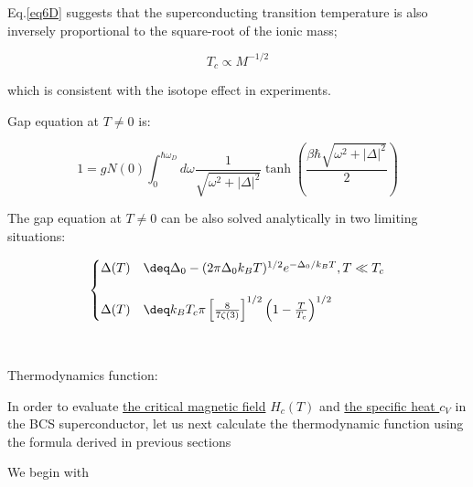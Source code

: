 Eq.\eqref{eq6D} suggests that the superconducting transition temperature is also inversely proportional to the square-root of the ionic mass; 

\[T_c\propto M^{-1/2} \]

which is consistent with the isotope effect in experiments. 

Gap equation at $T\neq 0$ is:

\[1=gN(0)\int_0^{\hbar\omega_D}d\omega\frac{1}{\sqrt{\omega^2+|\Delta|^2}}\tanh\left(\frac{\beta\hbar\sqrt{\omega^2+|\Delta|^2}}{2}\right) \]

The gap equation at $T\neq0$ can be also solved analytically in two limiting situations:

\[\begin{cases}
\Delta(T)&\deq \Delta_0 - (2\pi\Delta_0k_BT)^{1/2}e^{-\Delta_0/k_BT}, T\ll T_c\\
&\\
\Delta(T)&\deq k_BT_c\pi\left[\frac{8}{7\zeta(3)}\right]^{1/2}\left(1-\frac{T}{T_c}\right)^{1/2}
\end{cases}\]

\dotfill

\ 

Thermodynamics function:

In order to evaluate \uline{the critical magnetic field} $H_c(T)$ and \uline{the specific heat $c_V$} in the BCS superconductor, let us next calculate the thermodynamic function using the formula derived in previous sections %

We begin with

